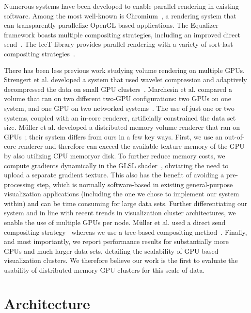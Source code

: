 Numerous systems have been developed to enable parallel rendering in
existing software.  Among the most well-known is
Chromium~\cite{HHN:2002:???}, a rendering system that can transparently
parallelize OpenGL-based applications.  The Equalizer framework boasts
multiple compositing strategies, including an improved direct
send~\cite{EP:2007:???}.  The IceT library provides parallel rendering
with a variety of sort-last compositing strategies~\cite{MWP:2001:???}.

There has been less previous work studying volume rendering on
multiple GPUs.  Strengert et al. developed a system that used wavelet
compression and adaptively decompressed the data on small GPU
clusters~\cite{SMW:2004:???}.  Marchesin et al. compared a volume that
ran on two different two-GPU configurations: two GPUs on one system,
and one GPU on two networked systems~\cite{Marchesin:2008:MultiGPU}. The
use of just one or two systems, coupled with an in-core renderer,
artificially constrained the data set size.  M\"uller et al. developed
a distributed memory volume renderer that ran on
GPUs~\cite{Mueller:2006:???}; their system differs from ours in a few
key ways.  First, we use an out-of-core renderer and therefore can
exceed the available texture memory of the GPU by also utilizing CPU
memoryor disk.  To further reduce memory costs, we compute gradients
dynamically in the GLSL shader~\cite{KW:2003:???}, obviating the need
to upload a separate gradient texture.  This also has the benefit of
avoiding a pre-processing step, which is normally software-based in
existing general-purpose visualization applications (including the one
we chose to implement our system within) and can be time consuming for
large data sets.  Further differentiating our system and in line with
recent trends in visualization cluster architectures, we enable the use
of multiple GPUs per node.  M\"uller et al. used a direct send
compositing strategy~\cite{Hsu:1993:SRC, Ma:1993:DSend} whereas we use
a tree-based compositing method~\cite{MWP:2001:???}.  Finally, and
most importantly, we report performance results for substantially more
GPUs and much larger data sets, detailing the scalability of GPU-based
visualization clusters.  We therefore believe our work is the first
to evaluate the usability of distributed memory GPU clusters for this
scale of data.

\section{Architecture}
\label{sec:arch}

